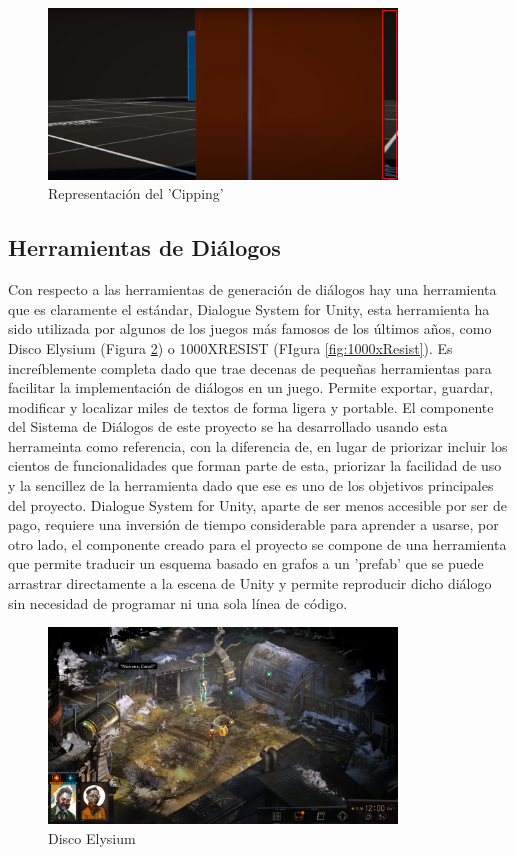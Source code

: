 \begin{figure}[H]
    \centering
    \includegraphics[width=350px,clip=true]{clipping.png}
    \caption{Representación del 'Cipping'}
    \label{fig:clipping}
\end{figure}

\subsection{Herramientas de Diálogos}
Con respecto a las herramientas de generación de diálogos hay una herramienta que es claramente el estándar, Dialogue System for Unity\cite{DialogueSystemUnity}, esta herramienta ha sido utilizada por algunos de los 
juegos más famosos de los últimos años, como Disco Elysium\cite{DiscoElysium} (Figura \ref{fig:discoelysium}) o 1000XRESIST\cite{1000xResist} (FIgura \ref{fig:1000xResist}). Es increíblemente completa dado que trae 
decenas de pequeñas herramientas para facilitar la implementación de diálogos en un juego. Permite exportar, guardar, modificar y localizar miles de textos de forma ligera y portable. El componente del Sistema de
 Diálogos de este proyecto se ha desarrollado usando esta herrameinta como referencia, con la diferencia de, en lugar de priorizar incluir los cientos de funcionalidades que forman parte de esta, priorizar la 
 facilidad de uso y la sencillez de la herramienta dado que ese es uno de los objetivos principales del proyecto. Dialogue System for Unity, aparte de ser menos accesible por ser de pago, requiere una inversión de 
 tiempo considerable para aprender a usarse, por otro lado, el componente creado para el proyecto se compone de una herramienta que permite traducir un esquema basado en grafos a un 'prefab' que se puede arrastrar 
 directamente a la escena de Unity y permite reproducir dicho diálogo sin necesidad de programar ni una sola línea de código.

\begin{figure}[H]
    \centering
    \includegraphics[width=350px,clip=true]{disco_elysium.png}
    \caption{Disco Elysium}
    \label{fig:discoelysium}
\end{figure}

